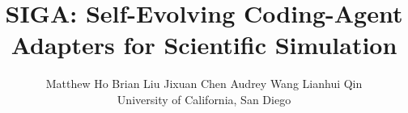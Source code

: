 \documentclass{article}
\title{SIGA: Self-Evolving Coding-Agent Adapters for Scientific Simulation}
\author{%
  Matthew Ho \quad Brian Liu \quad Jixuan Chen \quad Audrey Wang \quad Lianhui Qin \\[3pt]
  University of California, San Diego
}
\begin{document}
\maketitle


\begin{abstract}


\end{abstract}
\end{document}

